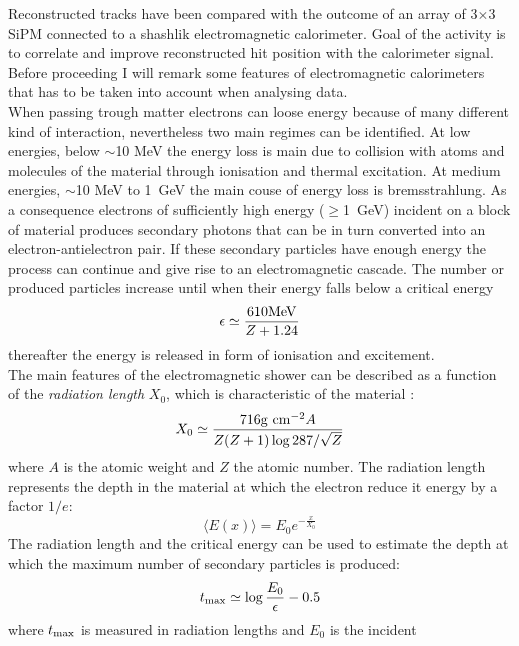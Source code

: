 Reconstructed tracks have been compared with the outcome of an array of
3$\times$3 SiPM connected to a shashlik electromagnetic calorimeter. Goal of the
activity is to correlate and improve reconstructed hit position with the
calorimeter signal. Before proceeding I will remark some features of
electromagnetic calorimeters that has to be taken into account when analysing
data.\\
When passing trough matter electrons can loose energy because of many different
kind of interaction, nevertheless two main regimes can be identified. At low
energies, below $\sim$10 MeV the energy loss is main due to collision with atoms
and molecules of the material through ionisation and thermal excitation. At
medium energies, $\sim$10 MeV to 1~GeV the main couse of energy loss is
bremsstrahlung. As a consequence electrons of sufficiently high energy
($\geq$1~GeV) incident on a block of material produces secondary photons that can
be in turn converted into an electron-antielectron pair. If these secondary
particles have enough energy the process can continue and give rise to an
electromagnetic cascade. The number or produced particles increase until when
their energy falls below a critical energy 
\begin{equation}\label{eq:critical_energy}
\epsilon \simeq \frac{610 {\rm MeV}}{Z + 1.24}
\end{equation}
thereafter the energy is
released in form of ionisation and excitement.\\
The main features of the electromagnetic shower can be described as a function
of the {\em radiation length} $X_0$, which is characteristic of the material
\cite{pdg}:
\begin{equation}\label{eq:radiation_length}
X_0 \simeq \frac{716 {\rm g\ cm^{-2}}A}{Z(Z+1)\log{287/\sqrt{Z}}}
\end{equation}
where $A$ is the atomic weight and $Z$ the atomic number. The radiation length
represents the depth in the material at which the electron reduce it energy by a
factor $1/e$:
\begin{equation}\label{eq:radiation_length}
\langle E(x) \rangle = E_0 e^{-\frac{x}{X_0}}
\end{equation}
The radiation length and the critical energy can be used to estimate the depth
at which the maximum number of secondary particles is produced:
\begin{equation}\label{eq:shower_max}
t_{\rm max} \simeq \log{\frac{E_0}{\epsilon}} - 0.5
\end{equation}
where $t_{\rm max}$ is measured in radiation lengths and $E_0$ is the incident
